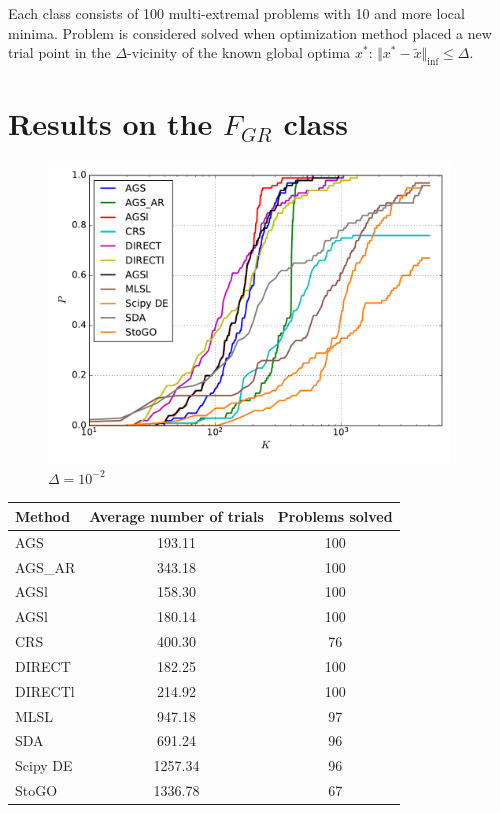 \documentclass[a4paper]{article}
\begin{document}
Each class consists of 100 multi-extremal problems with 10 and more local minima. Problem is considered solved when optimization method placed a new trial point in the $\Delta$-vicinity of the known global optima $x^*$: $\Vert x^* - \widetilde{x} \Vert_{\inf} \le \Delta$.


\section{Results on the $F_{GR}$ class}

\begin{figure}[H]
  \center
  \includegraphics[width=0.95\textwidth]{../experiments/grish/cmc.pdf}
  \caption{$\Delta=10^{-2}$}
\end{figure}

\begin{tabular}{lcc}
\hline
 Method   &  Average number of trials  &  Problems solved  \\
\hline
 AGS      &           193.11           &        100        \\
 AGS\_AR   &           343.18           &        100        \\
 AGSl     &           158.30           &        100        \\
 AGSl     &           180.14           &        100        \\
 CRS      &           400.30           &        76         \\
 DIRECT   &           182.25           &        100        \\
 DIRECTl  &           214.92           &        100        \\
 MLSL     &           947.18           &        97         \\
 SDA      &           691.24           &        96         \\
 Scipy DE &          1257.34           &        96         \\
 StoGO    &          1336.78           &        67         \\
\hline
\end{tabular}
\end{document}
